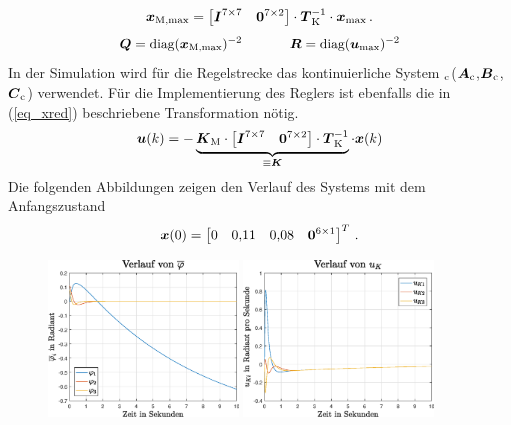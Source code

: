\begin{equation}
\boldsymbol{x}_{\text{M,max}} = \begin{bmatrix}
\boldsymbol{I}^{7\times 7} & \boldsymbol{0}^{7\times 2}
\end{bmatrix}\cdot \boldsymbol{T}^{-1}_{\text{K}} \cdot \boldsymbol{x}_{\text{max}} \,.
\label{eq_xred}
\end{equation}
\begin{equation}
\boldsymbol{Q} = \text{diag}(\boldsymbol{x}_{\text{M,max}})^{-2} \hspace{35pt} \boldsymbol{R} = \text{diag}(\boldsymbol{u}_{\text{max}})^{-2}
\end{equation}
In der Simulation wird für die Regelstrecke das kontinuierliche System $_{\text{c}}$($\boldsymbol{A}_{\text{c}}$,$\boldsymbol{B}_{\text{c}}$,$\boldsymbol{C}_{\text{c}}$) verwendet. Für die Implementierung des Reglers ist ebenfalls die in (\ref{eq_xred}) beschriebene Transformation nötig.
\begin{equation}
\boldsymbol{u}(k) = -\underbrace{\boldsymbol{K}_{\text{M}}\cdot \begin{bmatrix}
\boldsymbol{I}^{7\times 7} & \boldsymbol{0}^{7\times 2}
\end{bmatrix} \cdot \boldsymbol{T}^{-1}_{\text{K}}}_{\equiv \boldsymbol{K}} \cdot \boldsymbol{x}(k)
\end{equation}
Die folgenden Abbildungen zeigen den Verlauf des Systems mit dem Anfangszustand
\begin{equation}
\boldsymbol{x}(0) = \begin{bmatrix}
0 & 0{,}11 & 0{,}08 & \boldsymbol{0}^{6\times 1}
\end{bmatrix}^T \,.
\end{equation}
\vspace*{-2.5cm}
\begin{figure}[!ht]
\centering
\includegraphics[width=0.45\textwidth]{img/lin_sim1_phi.eps}\hspace{0.7cm}
\includegraphics[width=0.45\textwidth]{img/lin_sim1_uk.eps}
\end{figure}
\pagebreak

